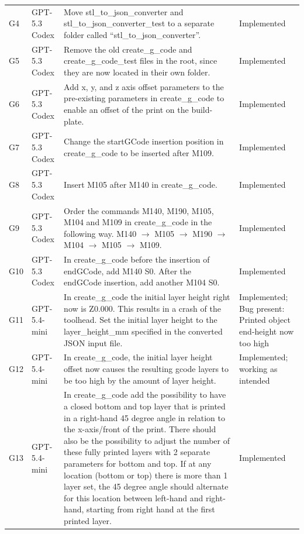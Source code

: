 \documentclass[10pt,twocolumn,a4paper]{article}
\begin{document}
\begin{longtable}{@{}p{0.6cm}p{1.5cm}p{11.0cm}p{2.7cm}@{}}
\addlinespace
G4 & GPT-5.3 Codex & Move stl\_to\_json\_converter and stl\_to\_json\_converter\_test to a separate folder called ``stl\_to\_json\_converter''. & Implemented \\
\addlinespace
G5 & GPT-5.3 Codex & Remove the old create\_g\_code and create\_g\_code\_test files in the root, since they are now located in their own folder. & Implemented \\
\addlinespace
G6 & GPT-5.3 Codex & Add x, y, and z axis offset parameters to the pre-existing parameters in create\_g\_code to enable an offset of the print on the build-plate. & Implemented \\
\addlinespace
G7 & GPT-5.3 Codex & Change the startGCode insertion position in create\_g\_code to be inserted after M109. & Implemented \\
\addlinespace
G8 & GPT-5.3 Codex & Insert M105 after M140 in create\_g\_code. & Implemented \\
\addlinespace
G9 & GPT-5.3 Codex & Order the commands M140, M190, M105, M104 and M109 in create\_g\_code in the following way. M140 $\rightarrow$ M105 $\rightarrow$ M190 $\rightarrow$ M104 $\rightarrow$ M105 $\rightarrow$ M109. & Implemented \\
\addlinespace
G10 & GPT-5.3 Codex & In create\_g\_code before the insertion of endGCode, add M140 S0. After the endGCode insertion, add another M104 S0. & Implemented \\
\addlinespace
G11 & GPT-5.4-mini & In create\_g\_code the initial layer height right now is Z0.000. This results in a crash of the toolhead. Set the initial layer height to the layer\_height\_mm specified in the converted JSON input file. & Implemented; Bug present: Printed object end-height now too high \\
\addlinespace
G12 & GPT-5.4-mini & In create\_g\_code, the initial layer height offset now causes the resulting gcode layers to be too high by the amount of layer height. & Implemented; working as intended \\
\addlinespace
G13 & GPT-5.4-mini & In create\_g\_code add the possibility to have a closed bottom and top layer that is printed in a right-hand 45 degree angle in relation to the x-axis/front of the print. There should also be the possibility to adjust the number of these fully printed layers with 2 separate parameters for bottom and top. If at any location (bottom or top) there is more than 1 layer set, the 45 degree angle should alternate for this location between left-hand and right-hand, starting from right hand at the first printed layer. & Implemented \\

\end{longtable}
\end{document}

